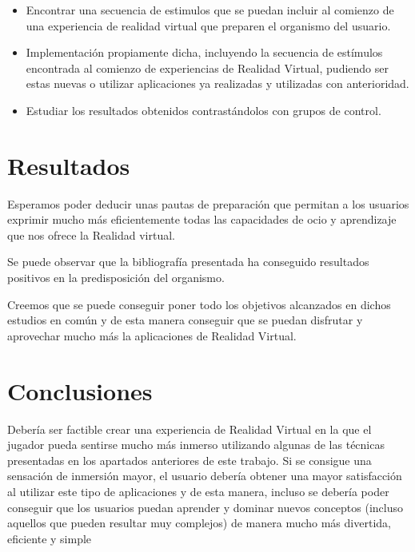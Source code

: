 \documentclass[twoside,twocolumn]{article}
\begin{document}
\begin{itemize}
\item Encontrar una secuencia de estimulos que se puedan incluir al comienzo de una experiencia de realidad virtual que preparen el organismo del usuario.
\item Implementación propiamente dicha, incluyendo la secuencia de estímulos encontrada al comienzo de experiencias de Realidad Virtual, pudiendo ser estas nuevas o utilizar aplicaciones ya realizadas y utilizadas con anterioridad.
\item Estudiar los resultados obtenidos contrastándolos con grupos de control.
\end{itemize}

\section{Resultados}
Esperamos poder deducir unas pautas de preparación que permitan a los usuarios exprimir mucho más eficientemente todas las capacidades de ocio y aprendizaje que nos ofrece la Realidad virtual.

Se puede observar que la bibliografía presentada ha conseguido resultados positivos en la predisposición del organismo.

Creemos que se puede conseguir poner todo los objetivos alcanzados en dichos estudios en común y de esta manera conseguir que se puedan disfrutar y aprovechar mucho más la aplicaciones de Realidad Virtual.

\section{Conclusiones}
Debería ser factible crear una experiencia de Realidad Virtual en la que el jugador pueda sentirse mucho más inmerso utilizando algunas de las técnicas presentadas en los apartados anteriores de este trabajo. Si se consigue una sensación de inmersión mayor, el usuario debería obtener una mayor satisfacción al utilizar este tipo de aplicaciones y de esta manera, incluso se debería poder conseguir que los usuarios puedan aprender y dominar nuevos conceptos (incluso aquellos que pueden resultar muy complejos) de manera mucho más divertida, eficiente y simple

\medskip
\nocite{*}
\printbibliography
\end{document}
